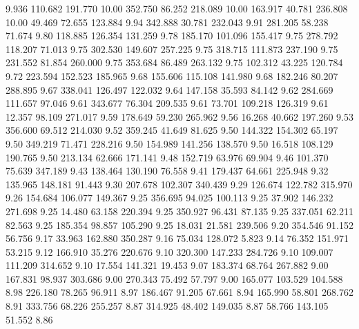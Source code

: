    9.936  110.682  191.770        10.00
 352.750   86.252  218.089        10.00
 163.917   40.781  236.808        10.00
  49.469   72.655  123.884         9.94
 342.888   30.781  232.043         9.91
 281.205   58.238   71.674         9.80
 118.885  126.354  131.259         9.78
 185.170  101.096  155.417         9.75
 278.792  118.207   71.013         9.75
 302.530  149.607  257.225         9.75
 318.715  111.873  237.190         9.75
 231.552   81.854  260.000         9.75
 353.684   86.489  263.132         9.75
 102.312   43.225  120.784         9.72
 223.594  152.523  185.965         9.68
 155.606  115.108  141.980         9.68
 182.246   80.207  288.895         9.67
 338.041  126.497  122.032         9.64
 147.158   35.593   84.142         9.62
 284.669  111.657   97.046         9.61
 343.677   76.304  209.535         9.61
  73.701  109.218  126.319         9.61
  12.357   98.109  271.017         9.59
 178.649   59.230  265.962         9.56
  16.268   40.662  197.260         9.53
 356.600   69.512  214.030         9.52
 359.245   41.649   81.625         9.50
 144.322  154.302   65.197         9.50
 349.219   71.471  228.216         9.50
 154.989  141.256  138.570         9.50
  16.518  108.129  190.765         9.50
 213.134   62.666  171.141         9.48
 152.719   63.976   69.904         9.46
 101.370   75.639  347.189         9.43
 138.464  130.190   76.558         9.41
 179.437   64.661  225.948         9.32
 135.965  148.181   91.443         9.30
 207.678  102.307  340.439         9.29
 126.674  122.782  315.970         9.26
 154.684  106.077  149.367         9.25
 356.695   94.025  100.113         9.25
  37.902  146.232  271.698         9.25
  14.480   63.158  220.394         9.25
 350.927   96.431   87.135         9.25
 337.051   62.211   82.563         9.25
 185.354   98.857  105.290         9.25
  18.031   21.581  239.506         9.20
 354.546   91.152   56.756         9.17
  33.963  162.880  350.287         9.16
  75.034  128.072    5.823         9.14
  76.352  151.971   53.215         9.12
 166.910   35.276  220.676         9.10
 320.300  147.233  284.726         9.10
 109.007  111.209  314.652         9.10
  17.554  141.321   19.453         9.07
 183.374   68.764  267.882         9.00
 167.831   98.937  303.686         9.00
 270.343   75.492   57.797         9.00
 165.077  103.529  104.588         8.98
 226.180   78.265   96.911         8.97
 186.467   91.205   67.661         8.94
 165.990   58.801  268.762         8.91
 333.756   68.226  255.257         8.87
 314.925   48.402  149.035         8.87
  58.766  143.105   51.552         8.86
